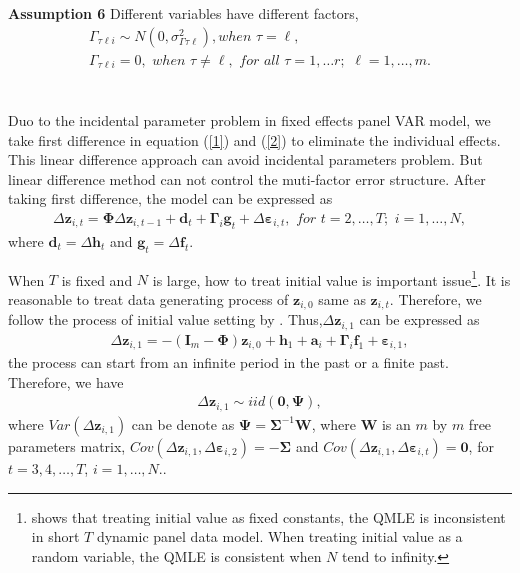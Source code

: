 \documentclass[12pt,a4paper,hyperref]{article}
\begin{document}
\\ \\
\textbf{Assumption 6}
Different variables have different factors,
\begin{align}
\Gamma_{\tau \ell i}\sim N\left(0,\sigma^{2}_{\Gamma \tau \ell}  \right), when\,\,\tau = \ell , \\
\Gamma_{\tau \ell i}=0 ,\,\, when\,\,\tau \neq \ell, \,\, for \,\, all \,\,\tau=1,\ldots r ;\,\, \ell=1,\ldots, m.
\end{align}
\\ \\
Duo to the incidental parameter problem in fixed effects panel VAR model, we take first difference in equation (\ref{1}) and (\ref{2})  to eliminate the individual effects. This linear difference approach can avoid incidental parameters problem. But linear difference method can not control the muti-factor error structure.  After taking first difference, the model can be expressed as
\begin{align}
\Delta \boldsymbol{z}_{i,t}=\boldsymbol{\Phi} \Delta \boldsymbol{z}_{i,t-1}+\boldsymbol{d}_{t}+\boldsymbol{\Gamma}_{i}\boldsymbol{g}_{t} +\Delta \boldsymbol{\varepsilon}_{i,t}, \,\, for \,\, t=2,\ldots, T;\,\,i=1,\ldots,N, \label{4}
\end{align}
where
 $\boldsymbol{d}_{t}=\Delta \boldsymbol{h}_{t}$ and $\boldsymbol{g}_{t}=\Delta \boldsymbol{f}_{t}$.



When $T$ is fixed and $N$ is large, how to treat initial value is important issue\footnote{\citet{HsiaoZhou:2018} shows that treating initial value as fixed constants, the QMLE is inconsistent in short $T$ dynamic panel data model. When treating initial value as a random variable, the QMLE is consistent when $N$ tend to infinity. }.
It is reasonable to treat data generating process of $\boldsymbol{z}_{i,0}$  same as $\boldsymbol{z}_{i,t}$.
Therefore,  we follow the process of initial value setting by \citet{Binder:2005}.
 Thus,$\Delta \boldsymbol{z}_{i,1}$ can be expressed as
\begin{align}
\Delta \boldsymbol{z}_{i,1}=-(\boldsymbol{I}_{m}-\boldsymbol{\Phi})\boldsymbol{z}_{i,0} +\boldsymbol{h}_{1}+\boldsymbol{a}_{i}+\boldsymbol{\Gamma}_{i}\boldsymbol{f}_{1} + \boldsymbol{\varepsilon}_{i,1}, \label{6}
\end{align}
the process can start from an infinite period in the past or  a finite past.
Therefore, we have
\begin{align}
\Delta \boldsymbol{z}_{i,1}\sim iid(\boldsymbol{0},\boldsymbol{\Psi}),
\end{align}
 where $Var\left(\Delta \boldsymbol{z}_{i,1} \right)$ can be denote as $\boldsymbol{\Psi}=\boldsymbol{\Sigma}^{-1}\boldsymbol{W} $, where $\boldsymbol{W}$ is an $m$ by $m$ free parameters matrix, $Cov\left(\Delta \boldsymbol{z}_{i,1},\Delta \boldsymbol{\varepsilon}_{i,2} \right)=-\boldsymbol{\Sigma}$ and $Cov \left(\Delta \boldsymbol{z}_{i,1},\Delta \boldsymbol{\varepsilon}_{i,t} \right)=\boldsymbol{0}$, for $t=3,4,\ldots,T$, $i=1,\ldots,N.$.
\end{document}
